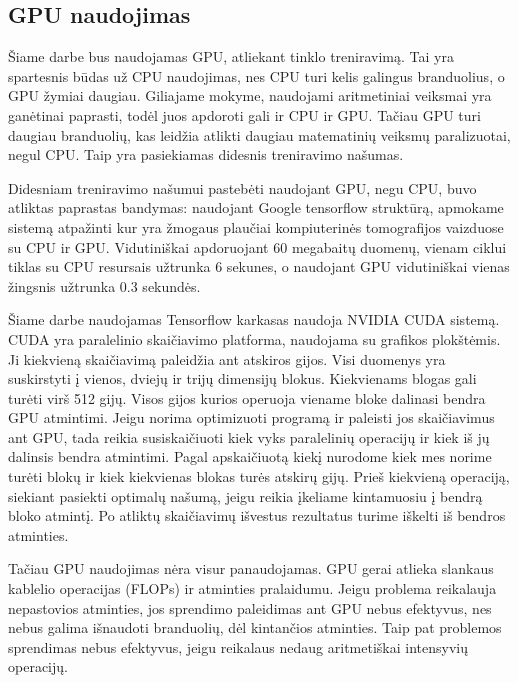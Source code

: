 \documentclass{VUMIFInfKursinis}
\begin{document}
\subsection{GPU naudojimas}
\par
Šiame darbe bus naudojamas GPU, atliekant tinklo treniravimą. Tai yra spartesnis būdas už CPU
naudojimas, nes CPU turi kelis galingus branduolius, o GPU žymiai daugiau. Giliajame mokyme,
naudojami aritmetiniai veiksmai yra ganėtinai paprasti, todėl juos apdoroti gali ir CPU ir GPU.
Tačiau GPU turi daugiau branduolių, kas leidžia atlikti daugiau matematinių veiksmų paralizuotai,
negul CPU. Taip yra pasiekiamas didesnis treniravimo našumas.
\par
Didesniam treniravimo našumui pastebėti naudojant GPU, negu CPU, buvo atliktas paprastas bandymas:
naudojant Google tensorflow struktūrą, apmokame sistemą atpažinti kur yra žmogaus plaučiai kompiuterinės
tomografijos vaizduose su CPU ir GPU. Vidutiniškai apdoruojant 60 megabaitų duomenų, vienam ciklui
tiklas su CPU resursais užtrunka 6 sekunes, o naudojant GPU vidutiniškai vienas žingsnis užtrunka
0.3 sekundės.
\par
Šiame darbe naudojamas Tensorflow karkasas naudoja NVIDIA CUDA sistemą.
CUDA yra paralelinio skaičiavimo platforma, naudojama su grafikos plokštėmis.
Ji kiekvieną skaičiavimą paleidžia ant atskiros gijos. Visi duomenys yra suskirstyti
į vienos, dviejų ir trijų dimensijų blokus. Kiekvienams blogas gali turėti virš 512
gijų. Visos gijos kurios operuoja viename bloke dalinasi bendra GPU atmintimi.
Jeigu norima optimizuoti programą ir paleisti jos skaičiavimus ant GPU, tada reikia
susiskaičiuoti kiek vyks paralelinių operacijų ir kiek iš jų dalinsis bendra atmintimi.
Pagal apskaičiuotą kiekį nurodome kiek mes norime turėti blokų ir kiek kiekvienas blokas
turės atskirų gijų. Prieš kiekvieną operaciją, siekiant pasiekti optimalų našumą, jeigu
reikia įkeliame kintamuosiu į bendrą bloko atmintį. Po atliktų skaičiavimų išvestus
rezultatus turime iškelti iš bendros atminties.
\par
Tačiau GPU naudojimas nėra visur panaudojamas. GPU gerai atlieka slankaus kablelio
operacijas (FLOPs) ir atminties pralaidumu. Jeigu problema reikalauja nepastovios atminties,
jos sprendimo paleidimas ant GPU nebus efektyvus, nes nebus galima išnaudoti branduolių,
dėl kintančios atminties. Taip pat problemos sprendimas nebus efektyvus, jeigu
reikalaus nedaug aritmetiškai intensyvių operacijų.
\end{document}
